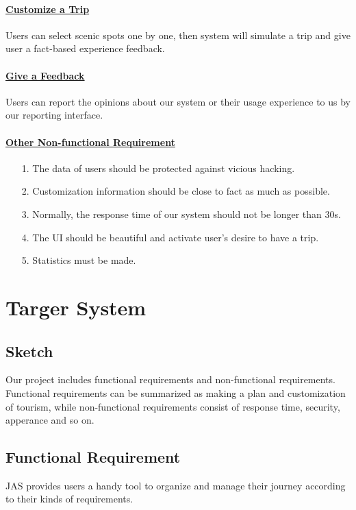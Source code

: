 \documentclass[10pt]{article}
\begin{document}
\paragraph{\underline{Customize a Trip}} Users can select scenic spots one by one, then system will simulate a trip and give user a fact-based experience feedback.

\paragraph{\underline{Give a Feedback}} Users can report the opinions about our system or their usage experience to us by our reporting interface.

\paragraph{\underline{Other Non-functional Requirement}}
\begin{itemize}
	\item[1.] The data of users should be protected against vicious hacking.
	\item[2.]	Customization information should be close to fact as much as possible.
	\item[3.]	Normally, the response time of our system should not be longer than 30s.
	\item[4.]	The UI should be beautiful and activate user’s desire to have a trip.
	\item[5.]	Statistics must be made.
	
\end{itemize}

\section{Targer System}
\subsection{Sketch}
Our project includes functional requirements and non-functional requirements. Functional requirements can be summarized as making a plan and customization of tourism, while non-functional requirements consist of response time, security, apperance and so on.

\subsection{Functional Requirement}
JAS provides users a handy tool to organize and manage their journey according to their kinds of requirements. 
\end{document}
